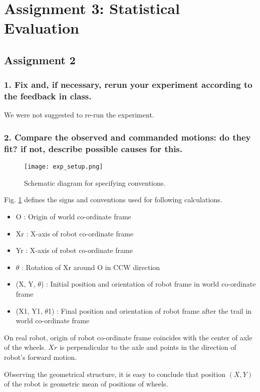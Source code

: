 \section*{Assignment 3: Statistical Evaluation}
\subsection*{Assignment 2}
\subsubsection*{1. Fix and, if necessary, rerun your experiment according to the feedback in class.}
We were not suggested to re-run the experiment.

\subsubsection*{2. Compare the observed and commanded motions: do they fit? if not, describe possible causes for this.} 

\begin{figure}[H]
\centering
\texttt{[image: exp\_setup.png]}
\caption{Schematic diagram for specifying conventions.}
\label{schematic-convention}
\end{figure}

Fig. \ref{schematic-convention} defines the signs and conventions used for following calculations. 
\begin{itemize}
	\item O : Origin of world co-ordinate frame
	\item Xr : X-axis of robot co-ordinate frame 
	\item Yr : X-axis of robot co-ordinate frame
	\item $\theta$ : Rotation of Xr around O in CCW direction
	\item (X, Y, $\theta$) :  Initial position and orientation of robot frame in world co-ordinate frame
	\item (X1, Y1, $\theta$1) : Final position and orientation of robot frame after the trail in world co-ordinate frame
\end{itemize}

\par On real robot, origin of robot co-ordinate frame coincides with the center of axle of the wheels. $Xr$ is perpendicular to the axle and points in the direction of robot's forward motion. \newline
\par Observing the geometrical structure, it is easy to conclude that position $(X, Y)$ of the robot is geometric mean of positions of wheels. 
\vspace{0.5cm}\\

